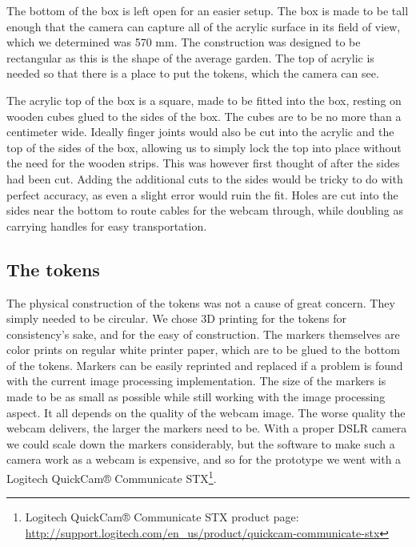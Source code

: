 The bottom of the box is left open for an easier setup.
The box is made to be tall enough that the camera can capture all of the acrylic surface in its field of view, which we determined was 570 mm.
The construction was designed to be rectangular as this is the shape of the average garden. %
The top of acrylic is needed so that there is a place to put the tokens, which the camera can see.

The acrylic top of the box is a square, made to be fitted into the box, resting on wooden cubes glued to the sides of the box. The cubes are to be no more than a centimeter wide. Ideally finger joints would also be cut into the acrylic and the top of the sides of the box, allowing us to simply lock the top into place without the need for the wooden strips. This was however first thought of after the sides had been cut. Adding the additional cuts to the sides would be tricky to do with perfect accuracy, as even a slight error would ruin the fit. 
Holes are cut into the sides near the bottom to route cables for the webcam through, while doubling as carrying handles for easy transportation. 

\subsection{The tokens}

The physical construction of the tokens was not a cause of great concern. They simply needed to be circular. We chose 3D printing for the tokens for consistency's sake, and for the easy of construction. The markers themselves are color prints on regular white printer paper, which are to be glued to the bottom of the tokens. Markers can be easily reprinted and replaced if a problem is found with the current image processing implementation. 
The size of the markers is made to be as small as possible while still working with the image processing aspect. It all depends on the quality of the webcam image. The worse quality the webcam delivers, the larger the markers need to be. With a proper DSLR camera we could scale down the markers considerably, but the software to make such a camera work as a webcam is expensive, and so for the prototype we went with a Logitech QuickCam® Communicate STX\footnote{Logitech QuickCam® Communicate STX product page: \url{http://support.logitech.com/en_us/product/quickcam-communicate-stx}}.\\


